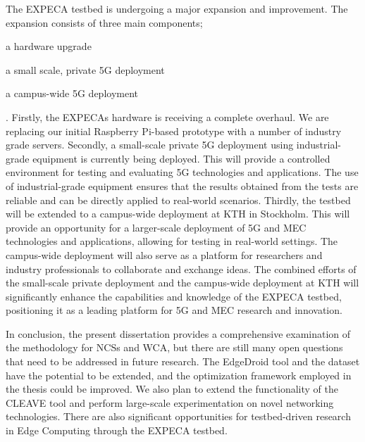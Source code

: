 The \gls{EXPECA} testbed is undergoing a major expansion and improvement.
The expansion consists of three main components;
\begin{inlineenum}
    \item a hardware upgrade
    \item a small scale, private 5G deployment
    \item a campus-wide 5G deployment
\end{inlineenum}.
Firstly, the \gls{EXPECA}s hardware is receiving a complete overhaul.
We are replacing our initial Raspberry Pi-based prototype with a number of industry grade servers.
Secondly, a small-scale private 5G deployment using industrial-grade equipment is currently being deployed.
This will provide a controlled environment for testing and evaluating 5G technologies and applications.
The use of industrial-grade equipment ensures that the results obtained from the tests are reliable and can be directly applied to real-world scenarios.
Thirdly, the testbed will be extended to a campus-wide deployment at \gls{KTH} in Stockholm.
This will provide an opportunity for a larger-scale deployment of 5G and \gls{MEC} technologies and applications, allowing for testing in real-world settings.
The campus-wide deployment will also serve as a platform for researchers and industry professionals to collaborate and exchange ideas.
The combined efforts of the small-scale private deployment and the campus-wide deployment at \gls{KTH} will significantly enhance the capabilities and knowledge of the \gls{EXPECA} testbed, positioning it as a leading platform for 5G and \gls{MEC} research and innovation.

In conclusion, the present dissertation provides a comprehensive examination of the methodology for \glspl{NCS} and \gls{WCA}, but there are still many open questions that need to be addressed in future research.
The EdgeDroid tool and the dataset have the potential to be extended, and the optimization framework employed in the thesis could be improved.
We also plan to extend the functionality of the \gls{CLEAVE} tool and perform large-scale experimentation on novel networking technologies.
There are also significant opportunities for testbed-driven research in Edge Computing through the \gls{EXPECA} testbed.

